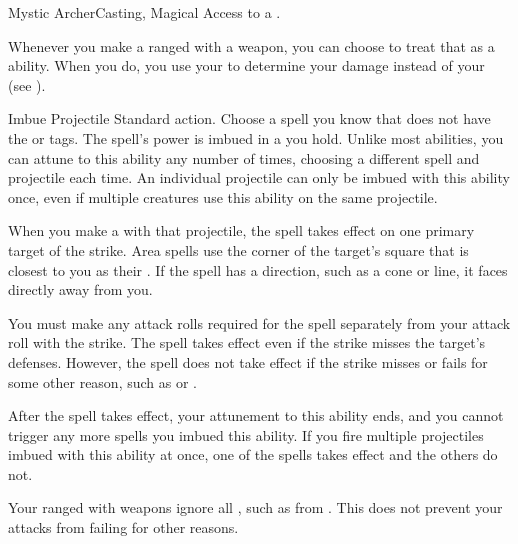   \begin{magicalfeat}{Mystic Archer}{Casting, Magical}
    \featpre Access to a .

     Whenever you make a ranged  with a  weapon, you can choose to treat that as a \magical ability.
    When you do, you use your  to determine your damage instead of your  (see ).

    \begin{magicalattuneability}{Imbue Projectile}{}
      \abilityusagetime Standard action.
      \rankline
      Choose a spell you know that does not have the  or  tags.
      The spell's power is imbued in a  you hold.
      Unlike most  abilities, you can attune to this ability any number of times, choosing a different spell and projectile each time.
      An individual projectile can only be imbued with this ability once, even if multiple creatures use this ability on the same projectile.

      When you make a  with that projectile, the spell takes effect on one primary target of the strike.
      Area spells use the corner of the target's square that is closest to you as their .
      If the spell has a direction, such as a cone or line, it faces directly away from you.

      You must make any attack rolls required for the spell separately from your attack roll with the strike.
      The spell takes effect even if the strike misses the target's defenses.
      However, the spell does not take effect if the strike misses or fails for some other reason, such as  or .

      After the spell takes effect, your attunement to this ability ends, and you  cannot trigger any more spells you imbued this ability.
      If you fire multiple projectiles imbued with this ability at once, one of the spells takes effect and the others do not.
    \end{magicalattuneability}

     Your ranged  with  weapons ignore all , such as from .
    This does not prevent your attacks from failing for other reasons.


\end{magicalfeat}

